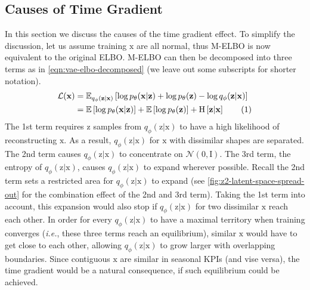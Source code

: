 \documentclass[sigconf]{acmart}
\newcommand{\numberthis}{\stepcounter{equation}\tag{\theequation}}
\newcommand{\IE}{\textit{i.e.}}
\newcommand{\vv}[1]{\bm{\mathrm{{#1}}}}
\newcommand{\EE}[1]{\operatorname{\mathbb{E}}\left[{#1}\right]}
\newcommand{\EEE}[2]{\operatorname{\mathbb{E}}_{{#1}}\left[{#2}\right]}
\newcommand{\Entropyy}[1]{\operatorname{H}\left[#1\right]}
\begin{document}

\subsection{Causes of Time Gradient}
\label{sec:clustering-effect-cause}

In this section we discuss the causes of the time gradient effect.
To simplify the discussion, let us assume training $\vv{x}$ are all normal, thus M-ELBO is now equivalent to the original ELBO. M-ELBO can then be decomposed into three terms as in \cref{eqn:vae-elbo-decomposed} (we leave out some subscripts for shorter notation).
\begin{align*}
	\mathcal{L}(\vv{x})
		&= \EEE{q_{\phi}(\vv{z}|\vv{x})}{
			\log p_{\theta}(\vv{x}|\vv{z}) + \log p_{\theta}(\vv{z}) - \log q_{\phi}(\vv{z}|\vv{x}) } \\
		&= \EE{\log p_{\theta}(\vv{x}|\vv{z})} +
			\EE{\log p_{\theta}(\vv{z})} +
			\Entropyy{\vv{z}|\vv{x}}
			\numberthis\label{eqn:vae-elbo-decomposed}
\end{align*}
The 1st term requires $\vv{z}$ samples from $q_{\phi}(\vv{z}|\vv{x})$ to have a high likelihood of reconstructing $\vv{x}$.
As a result, $q_{\phi}(\vv{z}|\vv{x})$ for $\vv{x}$ with dissimilar shapes are separated.
The 2nd term causes $q_{\phi}(\vv{z}|\vv{x})$ to concentrate on $\mathcal{N}(\vv{0},\vv{I})$.
The 3rd term, the entropy of $q_{\phi}(\vv{z}|\vv{x})$, causes $q_{\phi}(\vv{z}|\vv{x})$ to expand wherever possible.
Recall the 2nd term sets a restricted area for $q_{\phi}(\vv{z}|\vv{x})$ to expand (see \cref{fig:z2-latent-space-spread-out} for the combination effect of the 2nd and 3rd term).
Taking the 1st term into account, this expansion would also stop if $q_{\phi}(\vv{z}|\vv{x})$ for two dissimilar $\vv{x}$ reach each other.
In order for every $q_{\phi}(\vv{z}|\vv{x})$ to have a maximal territory when training converges (\IE, these three terms reach an equilibrium), similar $\vv{x}$ would have to get close to each other, allowing $q_{\phi}(\vv{z}|\vv{x})$ to grow larger with overlapping boundaries.
Since contiguous $\vv{x}$ are similar in seasonal KPIs (and vise versa), the time gradient would be a natural consequence, if such equilibrium could be achieved.
\end{document}
